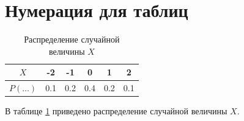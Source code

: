 \documentclass[12pt, a4paper]{article}  %
\begin{document}
\section{Нумерация для таблиц}

\begin{table}[H]
	\begin{center}
		\begin{tabular}{|c|c|c|c|c|c|}
			\hline
			$X$ & -2 & -1 & 0 & 1 & 2 \\
			\hline
			$P(\ldots)$ & 0.1 & 0.2 & 0.4 & 0.2 & 0.1 \\
			\hline
		\end{tabular}
	\caption{Распределение случайной величины $X$}\label{tab:random}
	\end{center}
\end{table}

В таблице \ref{tab:random} приведено распределение случайной величины $X$.
\end{document}
